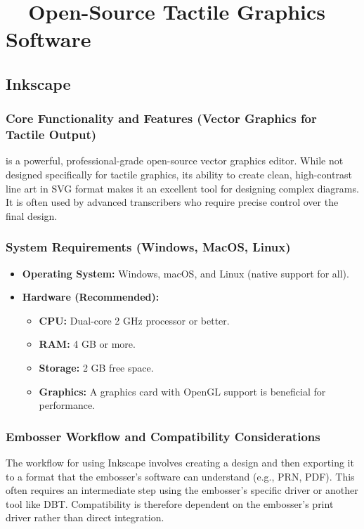 \section{~~Open-Source Tactile Graphics Software}\label{ch14:sec:open-source-software}
\subsection{Inkscape}\label{ch14:ssec:inkscape}
\subsubsection{Core Functionality and Features (Vector Graphics for Tactile Output)}\label{ch14:sssec:inkscape-features}
 is a powerful, professional-grade open-source vector graphics editor\supercite{SoftorageInkscape, SteemitInkscape}. While not designed specifically for tactile graphics, its ability to create clean, high-contrast line art in SVG format makes it an excellent tool for designing complex diagrams. It is often used by advanced transcribers who require precise control over the final design.

\subsubsection{System Requirements (Windows, MacOS, Linux)}\label{ch14:sssec:inkscape-sysreq}
\begin{itemize}
	\item \textbf{Operating System:} Windows, macOS, and Linux (native support for all).
	\item \textbf{Hardware (Recommended):}
	      \begin{itemize}
		      \item \textbf{CPU:} Dual-core 2 GHz processor or better.
		      \item \textbf{RAM:} 4 GB or more.
		      \item \textbf{Storage:} 2 GB free space.
		      \item \textbf{Graphics:} A graphics card with OpenGL support is beneficial for performance.
	      \end{itemize}
\end{itemize}

\subsubsection{Embosser Workflow and Compatibility Considerations}\label{ch14:sssec:inkscape-compat}
The workflow for using Inkscape involves creating a design and then exporting it to a format that the embosser's software can understand (e.g., PRN, PDF). This often requires an intermediate step using the embosser's specific driver or another tool like DBT. Compatibility is therefore dependent on the embosser's print driver rather than direct integration.

